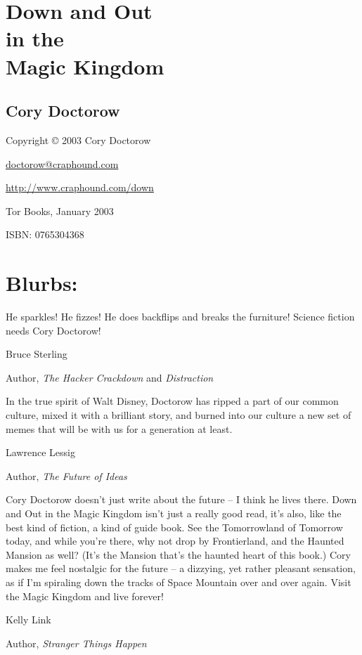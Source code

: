 \section{Down and Out\\in the\\Magic Kingdom}

\subsection{Cory Doctorow}

Copyright © 2003 Cory Doctorow

\href{mailto:doctorow@craphound.com}{doctorow@craphound.com}

\href{http://www.craphound.com/down}{http://www.craphound.com/down}

Tor Books, January 2003

ISBN: 0765304368

\section{Blurbs:}

He sparkles! He fizzes! He does backflips and breaks the furniture!
Science fiction needs Cory Doctorow!

Bruce Sterling

Author, \emph{The Hacker Crackdown} and \emph{Distraction}

In the true spirit of Walt Disney, Doctorow has ripped a part of
our common culture, mixed it with a brilliant story, and burned
into our culture a new set of memes that will be with us for a
generation at least.

Lawrence Lessig

Author, \emph{The Future of Ideas}

Cory Doctorow doesn't just write about the future -- I think he
lives there. Down and Out in the Magic Kingdom isn't just a really
good read, it's also, like the best kind of fiction, a kind of
guide book. See the Tomorrowland of Tomorrow today, and while
you're there, why not drop by Frontierland, and the Haunted Mansion
as well? (It's the Mansion that's the haunted heart of this book.)
Cory makes me feel nostalgic for the future -- a dizzying, yet
rather pleasant sensation, as if I'm spiraling down the tracks of
Space Mountain over and over again. Visit the Magic Kingdom and
live forever!

Kelly Link

Author, \emph{Stranger Things Happen}

